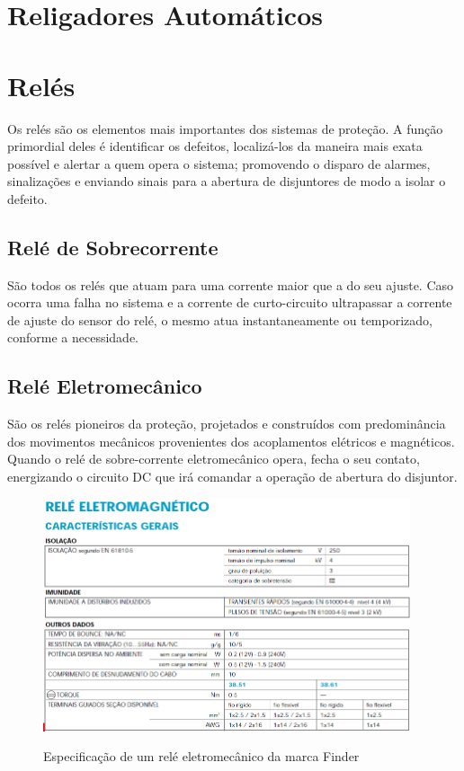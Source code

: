 \documentclass[a5paper,english,spanish,brazil]{ufsc-thesis}
\begin{document}
	\section{Religadores Automáticos}

	\section{Relés}
		Os relés são os elementos mais importantes dos sistemas de proteção. A função primordial deles é identificar os defeitos, localizá-los da maneira mais exata possível e alertar a quem opera o sistema; promovendo o disparo de alarmes, sinalizações e enviando sinais para a abertura de disjuntores de modo a isolar o defeito.\par

		\subsection{Relé de Sobrecorrente}
		São todos os relés que atuam para uma corrente maior que a do seu ajuste. Caso ocorra uma falha no sistema e a corrente de curto-circuito ultrapassar a corrente de ajuste do sensor do relé, o mesmo atua instantaneamente ou temporizado, conforme a necessidade.\par

		\subsection{Relé Eletromecânico}
		São os relés pioneiros da proteção, projetados e construídos com predominância dos movimentos mecânicos provenientes dos acoplamentos elétricos e magnéticos. Quando o relé de sobre-corrente eletromecânico opera, fecha o seu contato, energizando o circuito DC que irá comandar a operação de abertura do disjuntor.\par

		\begin{figure}[htb]
		  \caption{Especificação de um relé eletromecânico da marca Finder}
		  \centering
		  \includegraphics[width=10.8cm]{eletromag.jpg}
		  \label{fig:eletromag}
		\end{figure}
\end{document}
